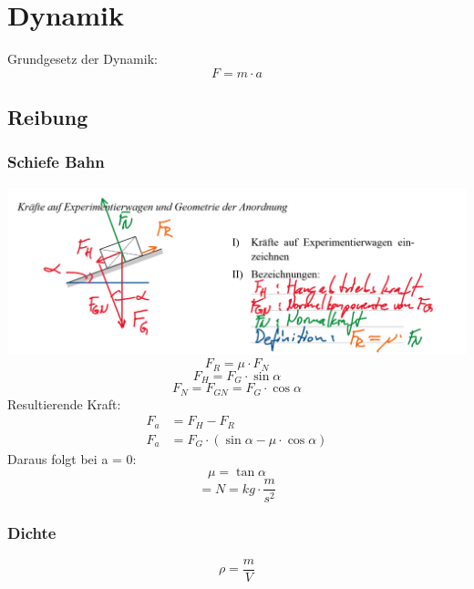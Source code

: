 \documentclass[a4paper]{article}
\begin{document}
  \section{Dynamik}
  Grundgesetz der Dynamik:
  \begin{equation}
    F = m \cdot a
  \end{equation}

  \subsection{Reibung}

  \subsubsection{Schiefe Bahn}

  \includegraphics[width=\textwidth]{images/dynamik_schiefe_bahn.png}
  \begin{equation}
    F_R = \mu \cdot F_N
  \end{equation}
  \begin{equation}
    F_H = F_G \cdot \sin{\alpha}
  \end{equation}
  \begin{equation}
    F_N = F_{GN} = F_{G} \cdot \cos{\alpha}
  \end{equation}
  Resultierende Kraft:
  \begin{align}
    F_a &= F_H - F_R \\
    F_a &= F_G \cdot (\sin{\alpha} - \mu \cdot \cos{\alpha})
  \end{align}
  Daraus folgt bei a = 0:
  \begin{equation}
    \mu = \tan{\alpha}
  \end{equation}
  \begin{equation}
    [F] = N = kg \cdot \frac{m}{s^2}
  \end{equation}

  \subsubsection{Dichte}
  \begin{equation}
    \rho = \frac{m}{V}
  \end{equation}
\end{document}
